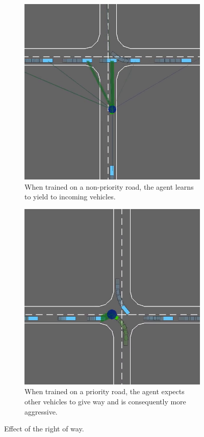 \begin{figure}[htp]
	\centering
	\begin{subfigure}[b]{0.48\linewidth}
		\includegraphics[width=\linewidth]{img/priority1}
		\caption{When trained on a non-priority road, the agent learns to yield to incoming vehicles.}
	\end{subfigure}
	\begin{subfigure}[b]{0.48\linewidth}
		\includegraphics[width=\linewidth]{img/priority2}
		\caption{When trained on a priority road, the agent expects other vehicles to give way and is consequently more aggressive.}
	\end{subfigure}
	\caption{Effect of the right of way.}
	\label{fig:priority}
\end{figure}

